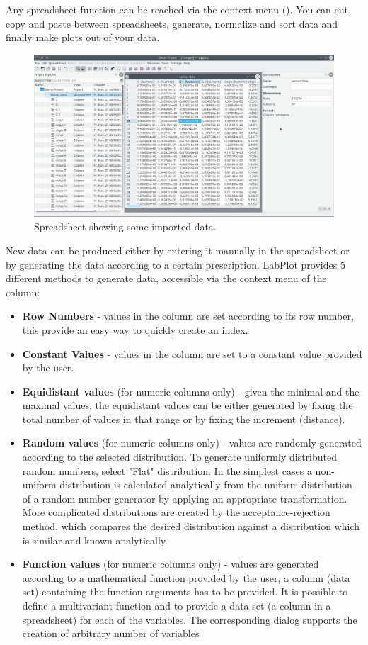 Any spreadsheet function can be reached via the context menu (\rmb).
You can cut, copy and paste between spreadsheets, generate, normalize and sort data and finally make plots out of your data.
\begin{figure}
\includegraphics[width=\textwidth]{images/spreadsheet.png}
\caption{Spreadsheet showing some imported data.}
\end{figure}

New data can be produced either by entering it manually in the spreadsheet or by generating the data according to a certain prescription.
LabPlot provides 5 different methods to generate data, accessible via the context menu of the column:
\begin{itemize}
\item \textbf{Row Numbers} - values in the column are set according to its row number, this provide an easy way to quickly create an index.
%
\item \textbf{Constant Values} - values in the column are set to a constant value provided by the user.
%
\item \textbf{Equidistant values} (for numeric columns only) - given the minimal and the maximal values, the equidistant values can be either generated
by fixing the total number of values in that range or by fixing the increment (distance).
%
\item \textbf{Random values} (for numeric columns only) - values are randomly generated according to the selected distribution.
To generate uniformly distributed random numbers, select "Flat" distribution.
In the simplest cases a non-uniform distribution is calculated analytically from the uniform distribution of a random number generator by applying
an appropriate transformation. More complicated distributions are created by the acceptance-rejection method, which compares the desired distribution
against a distribution which is similar and known analytically.
%
\item \textbf{Function values} (for numeric columns only) - values are generated according to a mathematical function provided by the user,
a column (data set) containing the function arguments has to be provided.
It is possible to define a multivariant function and to provide a data set (a column in a spreadsheet) for each of the variables.
The corresponding dialog supports the creation of arbitrary number of variables
\end{itemize}

